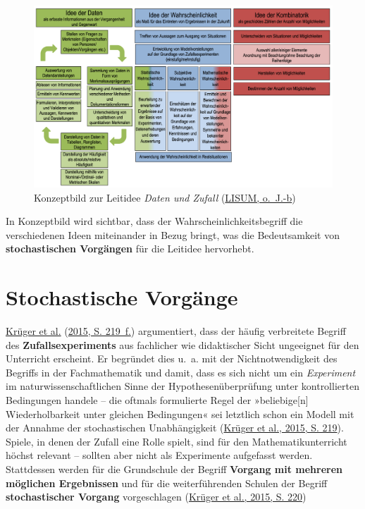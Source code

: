\documentclass[
  ngerman,
]{scrbook}
\theoremstyle{definition}
\theoremstyle{definition}
\theoremstyle{definition}
\theoremstyle{definition}
\theoremstyle{remark}
\begin{document}
\begin{figure}

{\centering \includegraphics[width=0.9\linewidth]{pictures/E-KonzeptDatenZufall} 

}

\caption{Konzeptbild zur Leitidee \emph{Daten und Zufall} (\protect\hyperlink{ref-LISUMa}{LISUM, o.~J.-b})}\label{fig:KonzeptDatenZufall}
\end{figure}

In Konzeptbild wird sichtbar, dass der Wahrscheinlichkeitsbegriff die verschiedenen Ideen miteinander in Bezug bringt, was die Bedeutsamkeit von \textbf{stochastischen Vorgängen} für die Leitidee hervorhebt.

\hypertarget{stochastische-vorguxe4nge}{%
\section{Stochastische Vorgänge}\label{stochastische-vorguxe4nge}}

\protect\hyperlink{ref-Kruger2015}{Krüger et al.} (\protect\hyperlink{ref-Kruger2015}{2015, S. 219~f.}) argumentiert, dass der häufig verbreitete Begriff des \textbf{Zufallsexperiments} aus fachlicher wie didaktischer Sicht ungeeignet für den Unterricht erscheint. Er begründet dies u.~a. mit der Nichtnotwendigkeit des Begriffs in der Fachmathematik und damit, dass es sich nicht um ein \emph{Experiment} im naturwissenschaftlichen Sinne der Hypothesenüberprüfung unter kontrollierten Bedingungen handele -- die oftmals formulierte Regel der »beliebige{[}n{]} Wiederholbarkeit unter gleichen Bedingungen« sei letztlich schon ein Modell mit der Annahme der stochastischen Unabhängigkeit (\protect\hyperlink{ref-Kruger2015}{Krüger et al., 2015, S. 219}). Spiele, in denen der Zufall eine Rolle spielt, sind für den Mathematikunterricht höchst relevant -- sollten aber nicht als Experimente aufgefasst werden. Stattdessen werden für die Grundschule der Begriff \textbf{Vorgang mit mehreren möglichen Ergebnissen} und für die weiterführenden Schulen der Begriff \textbf{stochastischer Vorgang} vorgeschlagen (\protect\hyperlink{ref-Kruger2015}{Krüger et al., 2015, S. 220})
\end{document}
